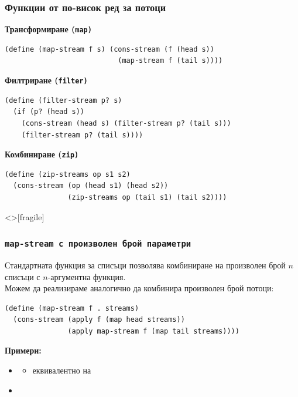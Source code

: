 \documentclass[alsotrans,beameroptions={aspectratio=169}]{beamerswitch}
\begin{document}
\begin{frame}[fragile]
  \frametitle{Функции от по-висок ред за потоци}

  \textbf{Трансформиране (\tt{map})}
\begin{lstlisting}
(define (map-stream f s) (cons-stream (f (head s))
                           (map-stream f (tail s))))
\end{lstlisting}
  \pause
  \textbf{Филтриране (\tt{filter})}
\begin{lstlisting}
(define (filter-stream p? s)
  (if (p? (head s))
    (cons-stream (head s) (filter-stream p? (tail s)))
    (filter-stream p? (tail s))))
\end{lstlisting}
  \pause
  \textbf{Комбиниране (\tt{zip})}
\begin{lstlisting}
(define (zip-streams op s1 s2)
  (cons-stream (op (head s1) (head s2))
               (zip-streams op (tail s1) (tail s2))))
\end{lstlisting}
\end{frame}

\begin{frame}<>[fragile]
  \frametitle{\tt{map-stream} с произволен брой параметри}

  Стандартната функция  за списъци позволява комбиниране на произволен брой $n$ списъци с $n$-аргументна функция.\\
  \pause
  Можем да реализираме  аналогично да комбинира произволен брой потоци:\\
  \pause
\begin{lstlisting}
(define (map-stream f . streams)
  (cons-stream (apply f (map head streams))
               (apply map-stream f (map tail streams))))
\end{lstlisting}
  \pause
  \textbf{Примери:}
  \begin{itemize}[<+->]
  \item {}
    \begin{itemize}
    \item еквивалентно на 
    \end{itemize}
  \item {}
  \end{itemize}
\end{frame}
\end{document}
